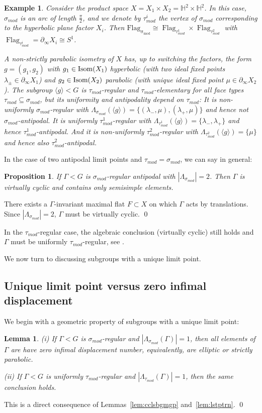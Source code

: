 \documentclass[12pt]{article}
\theoremstyle{boldplain}
\newtheorem{lem}[equation]{Lemma}
\newtheorem{prop}[equation]{Proposition}
\theoremstyle{bolddefinition}
\newtheorem{example}[equation]{Example}
\numberwithin{equation}{section}
\def\H{{\mathbb H}}
\def\Ga{\Gamma}
\def\la{\lambda}
\def\La{\Lambda}
\def\si{\sigma}
\def\Flag{\operatorname{Flag}}
\def\Flags{\operatorname{Flag_{\si_{mod}}}}
\def\geo{\partial_{\infty}}
\def\Isom{\mathop{\hbox{Isom}}}
\def\Las{\Lambda_{\sigma_{mod}}}
\def\LasGa{\Lambda_{\sigma_{mod}}(\Gamma)}
\def\LatGa{\Lambda_{\tau_{mod}}(\Gamma)}
\def\pihalf{\frac{\pi}{2}}
\def\simod{\si_{mod}}
\def\taumod{\tau_{mod}}
\def\<{\langle}
\def\>{\rangle}
\begin{document}
\begin{example}\label{ex:elementary4}
Consider the product space $X=X_1\times X_2=\H^2\times \H^2$. 
In this case, $\simod$ is an arc of length $\pihalf$,
and we denote by $\taumod^i$ the vertex of $\simod$ corresponding to the hyperbolic plane factor $X_i$.
Then $\Flags\cong\Flag_{\taumod^1}\times\Flag_{\taumod^2}$ with $\Flag_{\taumod^i}=\geo X_i\cong S^1$.

A {\em non-strictly parabolic isometry} of $X$ has, up to switching the factors, the form $g=(g_1, g_2)$ 
with $g_1\in \Isom(X_1)$ hyperbolic (with two ideal fixed points $\la_{\pm}\in\geo X_1$) 
and $g_2\in \Isom(X_2)$ parabolic (with unique ideal fixed point $\mu\in\geo X_2$). 
The subgroup $\<g\><G$ is $\taumod$-regular and $\taumod$-elementary for all face types $\taumod\subseteq\simod$, 
but its uniformity and antipodality depend on $\taumod$: 
It is non-uniformly $\simod$-regular
with $\Las(\<g\>)=\{(\la_-,\mu), (\la_+,\mu)\}$
and hence {\em not $\simod$-antipodal}.
It is uniformly $\taumod^1$-regular with $\La_{\taumod^1}(\<g\>)=\{\la_-,\la_+\}$
and hence {\em $\taumod^1$-antipodal}.
And it is non-uniformly $\taumod^2$-regular with $\La_{\taumod^2}(\<g\>)=\{\mu\}$
and hence also {\em $\taumod^2$-antipodal}.
\end{example}

\medskip
In the case of two antipodal limit points and $\taumod=\simod$, we can say in general:
\begin{prop}
If $\Ga<G$ is $\simod$-regular antipodal with $|\Las|=2$.
Then $\Ga$ is virtually cyclic and contains only semisimple elements. 
\end{prop}
\proof
There exists a $\Ga$-invariant maximal flat $F\subset X$ on which $\Ga$ acts by translations. 
Since $|\Las|=2$, $\Ga$ must be virtually cyclic.
\qed

\medskip
In the $\taumod$-regular case,
the algebraic conclusion (virtually cyclic) still holds 
and $\Ga$ must be uniformly $\taumod$-regular, 
see \cite[Lemma 5.45]{anolec}.  

We now turn to discussing subgroups with a unique limit point. 


\subsection{Unique limit point versus zero infimal displacement}

We begin with a geometric property of subgroups with a unique limit point:

\begin{lem}
\label{lem:parabolic}
(i)
If $\Ga< G$ is $\simod$-regular and $|\LasGa|=1$,
then all elements of $\Ga$ are have zero infimal displacement number,
equivalently, are elliptic or strictly parabolic.

(ii)
If $\Ga< G$ is uniformly $\taumod$-regular and $|\LatGa|=1$,
then the same conclusion holds.
\end{lem}
\proof 
This is a direct consequence of Lemmas~\ref{lem:cclsbgmgp} and~\ref{lem:lstptrn}.
\qed
\end{document}
